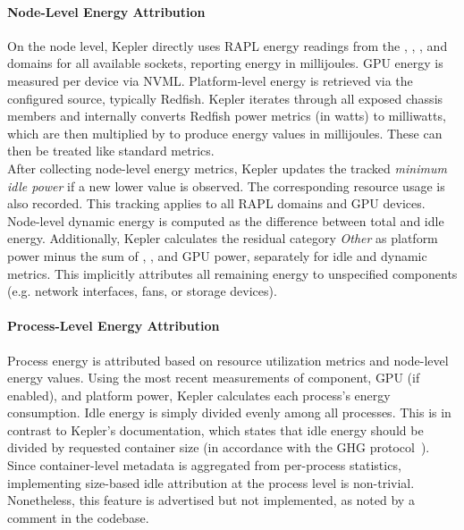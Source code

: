 \paragraph{Node-Level Energy Attribution}
On the node level, Kepler directly uses RAPL energy readings from the , , , and  domains for all available sockets, reporting energy in millijoules. GPU energy is measured per device via NVML. Platform-level energy is retrieved via the configured source, typically Redfish. Kepler iterates through all exposed chassis members and internally converts Redfish power metrics (in watts) to milliwatts, which are then multiplied by  to produce energy values in millijoules. These can then be treated like standard metrics.\\
After collecting node-level energy metrics, Kepler updates the tracked \emph{minimum idle power} if a new lower value is observed. The corresponding resource usage is also recorded. This tracking applies to all RAPL domains and GPU devices. Node-level dynamic energy is computed as the difference between total and idle energy. Additionally, Kepler calculates the residual category \emph{Other} as platform power minus the sum of , , and GPU power, separately for idle and dynamic metrics. This implicitly attributes all remaining energy to unspecified components (e.g. network interfaces, fans, or storage devices).

\paragraph{Process-Level Energy Attribution}
Process energy is attributed based on resource utilization metrics and node-level energy values. Using the most recent measurements of component, GPU (if enabled), and platform power, Kepler calculates each process’s energy consumption.  
Idle energy is simply divided evenly among all processes. This is in contrast to Kepler’s documentation, which states that idle energy should be divided by requested container size (in accordance with the GHG protocol~\parencite{gesi2024ictguidance}). Since container-level metadata is aggregated from per-process statistics, implementing size-based idle attribution at the process level is non-trivial. Nonetheless, this feature is advertised but not implemented, as noted by a  comment in the codebase.

